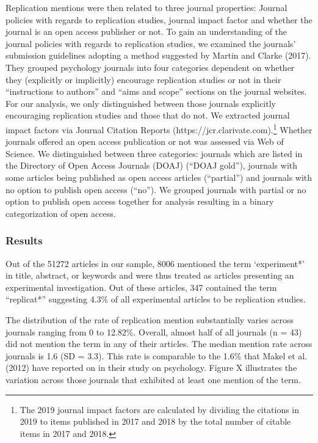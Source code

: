 \documentclass[]{elsarticle} %
\begin{document}
Replication mentions were then related to three journal properties:
Journal policies with regards to replication studies, journal impact
factor and whether the journal is an open access publisher or not. To
gain an understanding of the journal policies with regards to
replication studies, we examined the journals' submission guidelines
adopting a method suggested by Martin and Clarke (2017). They grouped
psychology journals into four categories dependent on whether they
(explicitly or implicitly) encourage replication studies or not in their
``instructions to authors'' and ``aims and scope'' sections on the
journal websites. For our analysis, we only distinguished between those
journals explicitly encouraging replication studies and those that do
not. We extracted journal impact factors via Journal Citation Reports
(https://jcr.clarivate.com).\footnote{The 2019 journal impact factors
  are calculated by dividing the citations in 2019 to items published in
  2017 and 2018 by the total number of citable items in 2017 and 2018.}
Whether journals offered an open access publication or not was assessed
via Web of Science. We distinguished between three categories: journals
which are listed in the Directory of Open Access Journals (DOAJ) (``DOAJ
gold''), journals with some articles being published as open access
articles (``partial'') and journals with no option to publish open
access (``no''). We grouped journals with partial or no option to
publish open access together for analysis resulting in a binary
categorization of open access.

\hypertarget{results}{%
\subsubsection{Results}\label{results}}

Out of the 51272 articles in our sample, 8006 mentioned the term
`experiment*' in title, abstract, or keywords and were thus treated as
articles presenting an experimental investigation. Out of these
articles, 347 contained the term ``replicat*'' suggesting 4.3\% of all
experimental articles to be replication studies.

The distribution of the rate of replication mention substantially varies
across journals ranging from 0 to 12.82\%. Overall, almost half of all
journals (n = 43) did not mention the term in any of their articles. The
median mention rate across journals is 1.6 (SD = 3.3). This rate is
comparable to the 1.6\% that Makel et al. (2012) have reported on in
their study on psychology. Figure X illustrates the variation across
those journals that exhibited at least one mention of the term.
\end{document}
